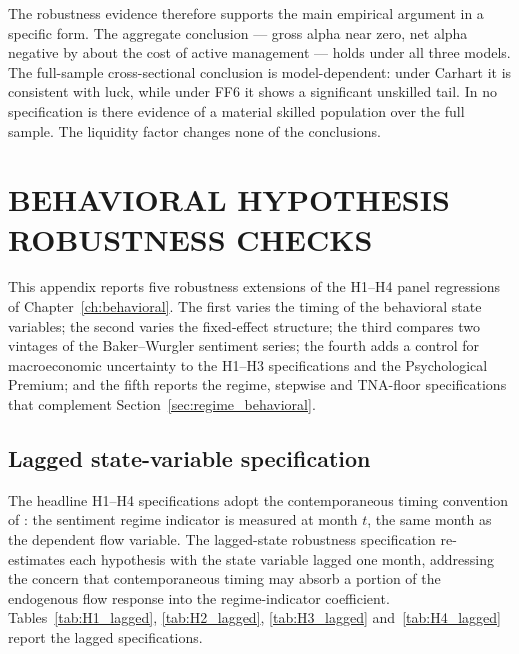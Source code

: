 \documentclass[12pt, oneside]{report}
\begin{document}
The robustness evidence therefore supports the main empirical argument in
a specific form. The aggregate conclusion --- gross alpha near zero, net
alpha negative by about the cost of active management --- holds under
all three models. The full-sample cross-sectional conclusion is
model-dependent: under Carhart it is consistent with luck, while under
FF6 it shows a significant unskilled tail. In no specification is there
evidence of a material skilled population over the full sample. The
\textcite{PastorStambaugh2003} liquidity factor changes none of the
conclusions.

\chapter{BEHAVIORAL HYPOTHESIS ROBUSTNESS CHECKS}
\label{app:behavioral_robustness}

\noindent This appendix reports five robustness extensions of the
H1--H4 panel regressions of Chapter~\ref{ch:behavioral}. The first
varies the timing of the behavioral state variables; the second
varies the fixed-effect structure; the third compares two vintages of
the Baker--Wurgler sentiment series; the fourth adds a control for
macroeconomic uncertainty to the H1--H3 specifications and the
Psychological Premium; and the fifth reports the regime, stepwise and
TNA-floor specifications that complement
Section~\ref{sec:regime_behavioral}.

\section{Lagged state-variable specification}
\label{sec:lagged_states}

\noindent The headline H1--H4 specifications adopt the contemporaneous
timing convention of \textcite{BakerWurgler2007}: the sentiment regime
indicator is measured at month $t$, the same month as the dependent
flow variable. The lagged-state robustness specification re-estimates
each hypothesis with the state variable lagged one month, addressing
the concern that contemporaneous timing may absorb a portion of the
endogenous flow response into the regime-indicator coefficient.
Tables~\ref{tab:H1_lagged}, \ref{tab:H2_lagged}, \ref{tab:H3_lagged}
and~\ref{tab:H4_lagged} report the lagged specifications.




\end{document}

